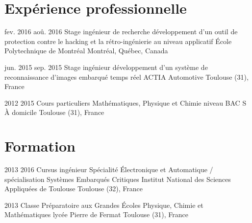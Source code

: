 \documentclass{custom_cv}
\begin{document}
\section{Expérience professionnelle}
\begin{Experience}
    \Item
    {fev. 2016}
    {aoû. 2016}
    {Stage ingénieur de recherche}
    {développement d'un outil de protection contre le hacking et la rétro-ingénierie au niveau applicatif}
    {École Polytechnique de Montréal}
    {Montréal, Québec, Canada}

    \Item
    {jun. 2015}
    {sep. 2015}
    {Stage ingénieur}
    {développement d'un système de reconnaissance d'images embarqué temps réel}
    {ACTIA Automotive}
    {Toulouse (31), France}

    \Item
    {2012}
    {2015}
    {Cours particuliers}
    {Mathématiques, Physique et Chimie niveau BAC S}
    {À domicile}
    {Toulouse (31), France}  
\end{Experience}

\section{Formation}
\begin{Experience}
    \Item
    {2013}
    {2016}
    {Cursus ingénieur}
    {Spécialité Électronique et Automatique / spécialisation Systèmes Embarqués Critiques}
    {Institut National des Sciences Appliquées de Toulouse}
    {Toulouse (32), France}

    {2013}
    {Classe Préparatoire aux Grandes Écoles}
    {Physique, Chimie et Mathématiques}
    {lycée Pierre de Fermat}
    {Toulouse (31), France}
\end{Experience}
\end{document}
